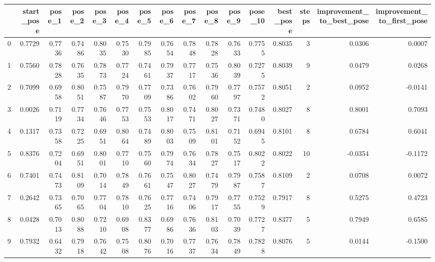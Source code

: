 \begin{tabular}{lrrrrrrrrrrrrrrr}
\toprule
{} &  start\_pose &  pose\_1 &  pose\_2 &  pose\_3 &  pose\_4 &  pose\_5 &  pose\_6 &  pose\_7 &  pose\_8 &  pose\_9 &  pose\_10 &  best\_pose &  steps &  improvement\_to\_best\_pose &  improvement\_to\_first\_pose \\
\midrule
0   &      0.7729 &  0.7736 &  0.7486 &  0.8035 &  0.7530 &  0.7985 &  0.7654 &  0.7848 &  0.7828 &  0.7633 &   0.7755 &     0.8035 &      3 &                    0.0306 &                     0.0007 \\
1   &      0.7560 &  0.7828 &  0.7635 &  0.7873 &  0.7724 &  0.7461 &  0.7937 &  0.7717 &  0.7536 &  0.8039 &   0.7275 &     0.8039 &      9 &                    0.0479 &                     0.0268 \\
2   &      0.7099 &  0.6958 &  0.8051 &  0.7587 &  0.7970 &  0.7709 &  0.7386 &  0.7602 &  0.7960 &  0.7797 &   0.7572 &     0.8051 &      2 &                    0.0952 &                    -0.0141 \\
3   &      0.0026 &  0.7119 &  0.7734 &  0.7646 &  0.7753 &  0.7553 &  0.8017 &  0.7471 &  0.8027 &  0.7371 &   0.7480 &     0.8027 &      8 &                    0.8001 &                     0.7093 \\
4   &      0.1317 &  0.7358 &  0.7225 &  0.6951 &  0.8064 &  0.7489 &  0.8003 &  0.7509 &  0.8101 &  0.7152 &   0.6945 &     0.8101 &      8 &                    0.6784 &                     0.6041 \\
5   &      0.8376 &  0.7204 &  0.6951 &  0.8001 &  0.7710 &  0.7560 &  0.7974 &  0.7634 &  0.7827 &  0.7517 &   0.8022 &     0.8022 &     10 &                   -0.0354 &                    -0.1172 \\
6   &      0.7401 &  0.7473 &  0.8109 &  0.7014 &  0.7849 &  0.7661 &  0.7547 &  0.8027 &  0.7479 &  0.7987 &   0.7587 &     0.8109 &      2 &                    0.0708 &                     0.0072 \\
7   &      0.2642 &  0.7365 &  0.7065 &  0.7704 &  0.7810 &  0.7625 &  0.7716 &  0.7406 &  0.7917 &  0.7755 &   0.7529 &     0.7917 &      8 &                    0.5275 &                     0.4723 \\
8   &      0.0428 &  0.7013 &  0.8088 &  0.7210 &  0.6908 &  0.8377 &  0.6986 &  0.7636 &  0.8103 &  0.7039 &   0.7727 &     0.8377 &      5 &                    0.7949 &                     0.6585 \\
9   &      0.7932 &  0.6432 &  0.7918 &  0.7642 &  0.7508 &  0.8076 &  0.7016 &  0.7737 &  0.7634 &  0.7849 &   0.7828 &     0.8076 &      5 &                    0.0144 &                    -0.1500 \\

\end{tabular}
